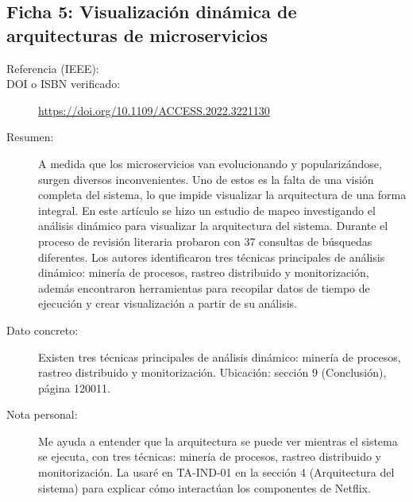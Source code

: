 \subsection{Ficha 5: Visualización dinámica de arquitecturas de microservicios}
\begin{description}
  \item[Referencia (IEEE):] 
  \item[DOI o ISBN verificado:] \url{https://doi.org/10.1109/ACCESS.2022.3221130}
  \item[Resumen:] A medida que los microservicios van evolucionando y popularizándose, surgen diversos inconvenientes. Uno de estos es la falta de una visión completa del sistema, lo que impide visualizar la arquitectura de una forma integral. En este artículo se hizo un estudio de mapeo investigando el análisis dinámico para visualizar la arquitectura del sistema. Durante el proceso de revisión literaria probaron con 37 consultas de búsquedas diferentes.
Los autores identificaron tres técnicas principales de análisis dinámico: minería de procesos, rastreo distribuido y monitorización, además encontraron herramientas para recopilar datos de tiempo de ejecución y crear visualización a partir de su análisis.
  \item[Dato concreto:] Existen tres técnicas principales de análisis dinámico: minería de procesos, rastreo distribuido y monitorización. Ubicación: sección 9 (Conclusión), página 120011.
  \item[Nota personal:] Me ayuda a entender que la arquitectura se puede ver mientras el sistema se ejecuta, con tres técnicas: minería de procesos, rastreo distribuido y monitorización.
La usaré en TA-IND-01 en la sección 4 (Arquitectura del sistema) para explicar cómo interactúan los componentes de Netflix.
\end{description}

